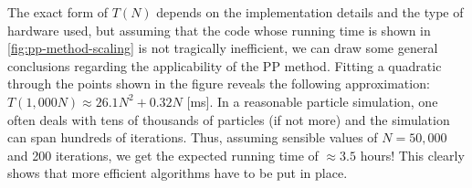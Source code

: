 The exact form of $T(N)$ depends on the implementation details and the type of hardware used, but assuming that the code whose running time is shown in \autoref{fig:pp-method-scaling} is not tragically inefficient, we can draw some general conclusions regarding the applicability of the PP method.
Fitting a quadratic through the points shown in the figure reveals the following approximation: $T(1{,}000N) \approx 26.1N^2 + 0.32N$ [ms].
In a reasonable particle simulation, one often deals with tens of thousands of particles (if not more) and the simulation can span hundreds of iterations.
Thus, assuming sensible values of $N = 50{,}000$ and 200 iterations, we get the expected running time of $\approx 3.5$ hours!
This clearly shows that more efficient algorithms have to be put in place.
